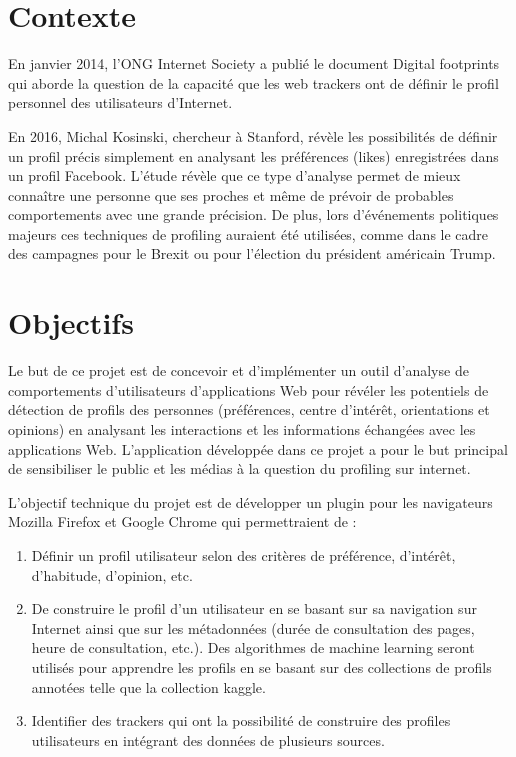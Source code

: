 \section{Contexte}

	En janvier 2014, l'ONG Internet Society a publié le document Digital footprints\cite{digital-footprints} qui aborde la question de la capacité que les web trackers ont de définir le profil personnel des utilisateurs d'Internet.
	
	En 2016, Michal Kosinski\cite{michal-kosinski}, chercheur à Stanford, révèle les possibilités de définir un profil précis simplement en analysant les préférences (likes) enregistrées dans un profil Facebook\cite{mining-big-data}. L'étude révèle que ce type d'analyse permet de mieux connaître une personne que ses proches et même de prévoir de probables comportements avec une grande précision. De plus, lors d'événements politiques majeurs ces techniques de profiling auraient été utilisées, comme dans le cadre des campagnes pour le Brexit ou pour l'élection du président américain Trump.\cite{motherboard-data}

\section{Objectifs}\label{objectifs}

	Le but de ce projet est de concevoir et d'implémenter un outil d'analyse de comportements d'utilisateurs d'applications Web pour révéler les potentiels de détection de profils des personnes (préférences, centre d'intérêt, orientations et opinions) en analysant les interactions et les informations échangées avec les applications Web. L'application développée dans ce projet a pour le but principal de sensibiliser le public et les médias à la question du profiling sur internet.

	L'objectif technique du projet est de développer un plugin pour les navigateurs Mozilla Firefox et Google Chrome qui permettraient de :

	\begin{enumerate}
		\item Définir un profil utilisateur selon des critères de préférence, d'intérêt, d'habitude, d'opinion, etc.
		\item De construire le profil d'un utilisateur en se basant sur sa navigation sur Internet ainsi que sur les métadonnées (durée de consultation des pages, heure de consultation, etc.). Des algorithmes de machine learning seront utilisés pour apprendre les profils en se basant sur des collections de profils annotées telle que la collection kaggle\cite{kaggle}. 
		\item Identifier des trackers qui ont la possibilité de construire des profiles utilisateurs en intégrant des données de plusieurs sources. 
	\end{enumerate}

